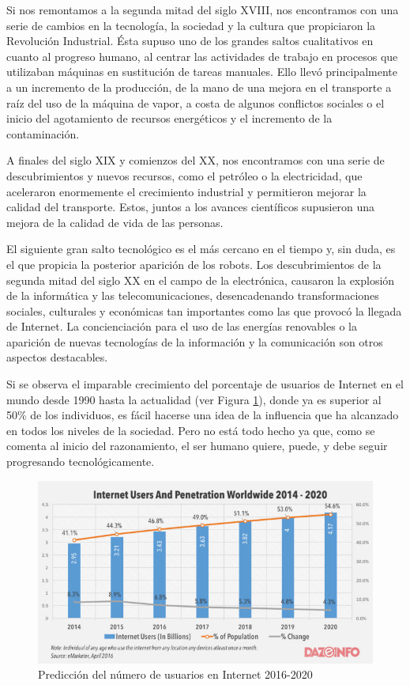 \documentclass[12pt,spanish,chapterprefix, numbers=noenddot]{book}
\numberwithin{equation}{section}
\numberwithin{figure}{section}
\begin{document}
Si nos remontamos a la segunda mitad del siglo XVIII,  nos encontramos con una serie de cambios en la tecnología, la sociedad y la cultura que propiciaron la Revolución Industrial. Ésta supuso uno de los grandes saltos cualitativos en cuanto al progreso humano, al centrar las actividades de trabajo en procesos que utilizaban máquinas en sustitución de tareas manuales. Ello llevó principalmente a un incremento de la producción, de la mano de una mejora en el transporte a raíz del uso de la máquina de vapor, a costa de algunos conflictos sociales o el inicio del agotamiento de recursos energéticos y el incremento de la contaminación. 

A finales del siglo XIX y comienzos del XX, nos encontramos con una serie de descubrimientos y nuevos recursos, como el petróleo o la electricidad, que aceleraron enormemente el crecimiento industrial y permitieron mejorar la calidad del transporte. Estos, juntos a los avances científicos supusieron una mejora de la calidad de vida de las personas.

El siguiente gran salto tecnológico es el más cercano en el tiempo y, sin duda, es el que propicia la posterior aparición de los robots. Los descubrimientos de la segunda mitad del siglo XX en el campo de la electrónica, causaron la explosión de la informática y las telecomunicaciones, desencadenando transformaciones sociales, culturales y económicas tan importantes como las que provocó la llegada de Internet. La concienciación para el uso de las energías renovables o la aparición de nuevas tecnologías de la información y la comunicación son otros aspectos destacables. 

Si se observa el imparable crecimiento del porcentaje de usuarios de Internet en el mundo desde 1990 hasta la actualidad (ver Figura \ref{fig:internetWorldwide}), donde ya es superior al 50\% de los individuos, es fácil hacerse una idea de la influencia que ha alcanzado en todos los niveles de la sociedad. Pero no está todo hecho ya que, como se comenta al inicio del razonamiento, el ser humano quiere, puede, y debe seguir progresando tecnológicamente.  %

\begin{figure}[hbt!]
\centering
\includegraphics[width=12cm]{Figs/internetWorldwide.jpg}
\par
\caption{\label{fig:internetWorldwide}Predicción del número de usuarios en Internet 2016-2020}
\end{figure}
\end{document}
